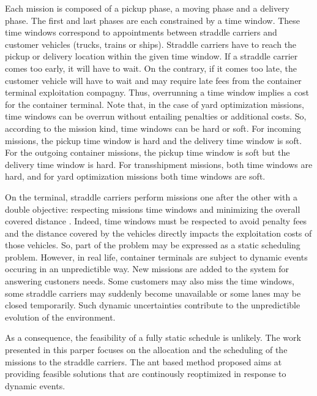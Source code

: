 \documentclass[review]{elsarticle}
\begin{document}
Each mission is composed of a pickup phase, a moving phase and a delivery phase. The first and last phases are each constrained by a time window. These time windows correspond to appointments between straddle carriers and customer vehicles (trucks, trains or ships). Straddle carriers have to reach the pickup or delivery location within the given time window. If a straddle carrier comes too early, it will have to wait. On the contrary, if it comes too late, the customer vehicle will have to wait and may require late fees from the container terminal exploitation compagny. Thus, overrunning a time window implies a cost for the container terminal. Note that, in the case of yard optimization missions, time windows can be overrun without entailing penalties or additional costs. So, according to the mission kind, time windows can be hard or soft. For incoming missions, the pickup time window is hard and the delivery time window is soft. For the outgoing container missions, the pickup time window is soft but the 
delivery time window is hard. For transshipment missions, both time windows are hard, and for yard optimization missions both time windows are soft. 

On the terminal, straddle carriers perform missions one after the other with a double objective: respecting missions time windows and minimizing the overall covered distance \cite{Lesauvage2009}. Indeed, time windows must be respected to avoid penalty fees and the distance covered by the vehicles directly impacts the exploitation costs of those vehicles. %
So, part of the problem may be expressed as a static scheduling problem.
However, in real life, container terminals are subject to dynamic events occuring in an unpredictible way. New missions are added to the system for answering custoners needs. Some customers may also miss the time windows, some straddle carriers may suddenly become unavailable or some lanes may be closed temporarily.
Such dynamic uncertainties contribute to the unpredictible evolution of the environment.

As a consequence, the feasibility of a fully static schedule is unlikely. The work presented in this parper focuses on the allocation and the scheduling of the missions to the straddle carriers. The ant based method proposed aims at providing feasible solutions that are continously reoptimized in response to dynamic events.
\end{document}
